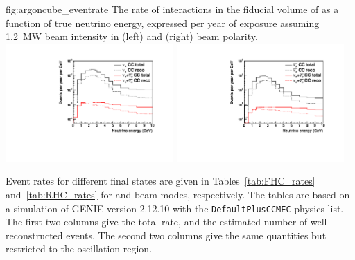 \begin{dunefigure}{fig:argoncube_eventrate}
{The rate of  interactions in the fiducial volume of  as a function of true neutrino energy, expressed per year of exposure assuming \SI{1.2}{\mega\watt} beam intensity in  (left) and  (right) beam polarity.}
	\includegraphics[width=0.48\textwidth]{graphics/event_rate_FHC.pdf}
	\includegraphics[width=0.48\textwidth]{graphics/event_rate_RHC.pdf}
\end{dunefigure}

Event rates for different final states are given in Tables~\ref{tab:FHC_rates} and~\ref{tab:RHC_rates} for  and  beam modes, respectively. The tables are based on a simulation of GENIE version 2.12.10 with the \texttt{DefaultPlusCCMEC} physics list. The first two columns give the total rate, and the estimated number of well-reconstructed events. The second two columns give the same quantities but restricted to the oscillation region.

